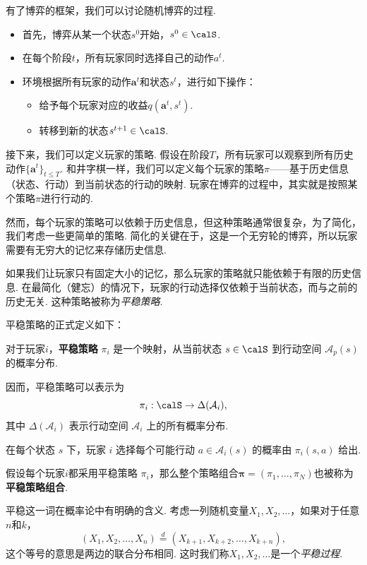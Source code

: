 有了博弈的框架，我们可以讨论随机博弈的过程. 
\begin{itemize}
    \item 首先，博弈从某一个状态$s^0$开始，$s^0\in \calS$.
    \item 在每个阶段$t$，所有玩家同时选择自己的动作$a^t$.
    \item 环境根据所有玩家的动作$\boldsymbol a^t$和状态$s^t$，进行如下操作：
    \begin{itemize}
        \item 给予每个玩家对应的收益$q(\boldsymbol a^t, s^t)$.
        \item 转移到新的状态$s^{t+1}\in \calS$.
    \end{itemize}
\end{itemize}
    
接下来，我们可以定义玩家的策略. 假设在阶段$T$，所有玩家可以观察到所有历史动作$\{\boldsymbol a^t\}_{t\leq T}$. 和井字棋一样，我们可以定义每个玩家的策略$\pi$——基于历史信息（状态、行动）到当前状态的行动的映射. 玩家在博弈的过程中，其实就是按照某个策略$\pi$进行行动的. 

然而，每个玩家的策略可以依赖于历史信息，但这种策略通常很复杂，为了简化，我们考虑一些更简单的策略. 简化的关键在于，这是一个无穷轮的博弈，所以玩家需要有无穷大的记忆来存储历史信息. 

如果我们让玩家只有固定大小的记忆，那么玩家的策略就只能依赖于有限的历史信息. 在最简化（健忘）的情况下，玩家的行动选择仅依赖于当前状态，而与之前的历史无关. 这种策略被称为\emph{平稳策略}.

平稳策略的正式定义如下：

\begin{definition}[平稳策略]
    对于玩家$i$，\textbf{平稳策略} $\pi_i$ 是一个映射，从当前状态 $s \in \calS$ 到行动空间 $\mathcal{A}_p(s)$ 的概率分布. 
    
    因而，平稳策略可以表示为 
    \[\pi_i : \calS \rightarrow \Delta(\mathcal{A}_i),\]
    其中 $\Delta(\mathcal{A}_i)$ 表示行动空间 $\mathcal{A}_i$ 上的所有概率分布. 
    
    在每个状态 $s$ 下，玩家 $i$ 选择每个可能行动 $a \in \mathcal{A}_i(s)$ 的概率由 $\pi_i(s,a)$ 给出. 
    
    假设每个玩家$i$都采用平稳策略 $\pi_i$，那么整个策略组合$\boldsymbol \pi=(\pi_1,\dots, \pi_N)$也被称为\textbf{平稳策略组合}.
\end{definition}

平稳这一词在概率论中有明确的含义. 考虑一列随机变量$X_1,X_2,\dots$，如果对于任意$n$和$k$，
\[(X_1,X_2,\dots,X_n)\stackrel{d}{=} (X_{k+1},X_{k+2},\dots,X_{k+n}),\]
这个等号的意思是两边的联合分布相同. 这时我们称$X_1,X_2,\dots$是一个\emph{平稳过程}.

